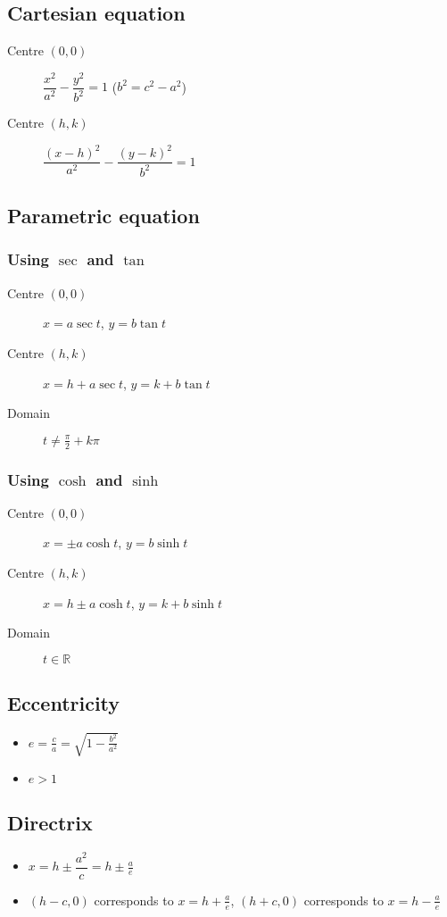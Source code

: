 \subsection{Cartesian equation}
\begin{description}
    \item[Centre $(0,0)$] $\dfrac{x^2}{a^2}-\dfrac{y^2}{b^2}=1$ ($b^2=c^2-a^2$)
    \item[Centre $(h,k)$] $\dfrac{(x-h)^2}{a^2}-\dfrac{(y-k)^2}{b^2}=1$
\end{description}
\subsection{Parametric equation}
\subsubsection{Using $\sec$ and $\tan$}
\begin{description}
    \item[Centre $(0,0)$] $x=a\sec t$, $y=b\tan t$
    \item[Centre $(h,k)$] $x=h+a\sec t$, $y=k+b\tan t$
    \item[Domain] $t\neq \frac{\pi}{2}+k\pi$
\end{description}
\subsubsection{Using $\cosh$ and $\sinh$}

\begin{description}
    \item[Centre $(0,0)$] $x=\pm a\cosh t$, $y=b\sinh t$
    \item[Centre $(h,k)$] $x=h\pm a\cosh t$, $y=k+b\sinh t$
    \item[Domain] $t \in \mathbb{R}$
\end{description}
\subsection{Eccentricity}
\begin{itemize}
    \item $e=\frac{c}{a}=\sqrt{1-\frac{b^2}{a^2}}$
    \item $e>1$
\end{itemize}
\subsection{Directrix}
\begin{itemize}
    \item $x=h\pm \dfrac{a^2}{c} = h\pm\frac{a}{e}$
    \item $(h-c, 0)$ corresponds to $x=h+\frac{a}{e}$, $(h+c, 0)$ corresponds to $x=h-\frac{a}{e}$
\end{itemize}
